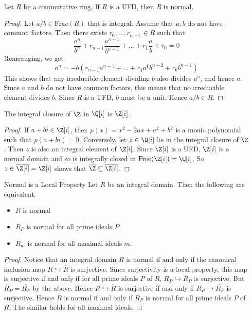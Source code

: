 \documentclass[a4paper]{article}
\begin{document}
\begin{prp}{}{} Let $R$ be a commutative ring. If $R$ is a UFD, then $R$ is normal. \tcbline
\begin{proof}
Let $a/b\in\text{Frac}(R)$ that is integral. Assume that $a,b$ do not have common factors. Then there exists $r_0,\dots,r_{n-1}\in R$ such that $$\frac{a^n}{b^n}+r_{n-1}\frac{a^{n-1}}{b^{n-1}}+\dots+r_1\frac{a}{b}+r_0=0$$ Rearranging, we get $$a^n=-b\left(r_{n-1}a^{n-1}+\dots+r_1a^1b^{n-2}+r_0b^{n-1}\right)$$ This shows that any irreducible element dividing $b$ also divides $a^n$, and hence $a$. Since $a$ and $b$ do not have common factors, this means that no irreducible element divides $b$. Since $R$ is a UFD, $b$ must be a unit. Hence $a/b\in R$. 
\end{proof}
\end{prp}

\begin{eg}{}{} The integral closure of $\Z$ in $\Q[i]$ is $\Z[i]$. \tcbline
\begin{proof}
If $a+bi\in\Z[i]$, then $p(x)=x^2-2ax+a^2+b^2$ is a monic polynomial such that $p(a+bi)=0$. Conversely, let $z\in\Q[i]$ lie in the integral closure of $\Z$. Then $z$ is also an integral element of $\Z[i]$. Since $\Z[i]$ is a UFD, $\Z[i]$ is a normal domain and so is integrally closed in $\text{Frac}(\Z[i])=\Q[i]$. So $z\in\overline{\Z[i]}=\Z[i]$ shows that $\overline{\Z}\subseteq\overline{\Z[i]}$. 
\end{proof}
\end{eg}

\begin{prp}{Normal is a Local Property}{} Let $R$ be an integral domain. Then the following are equivalent. 
\begin{itemize}
\item $R$ is normal
\item $R_P$ is normal for all prime ideals $P$
\item $R_m$ is normal for all maximal ideals $m$. 
\end{itemize} \tcbline
\begin{proof}
Notice that an integral domain $R$ is normal if and only if the canonical inclusion map $R\hookrightarrow\overline{R}$ is surjective. Since surjectivity is a local property, this map is surjective if and only if for all prime ideals $P$ of $R$, $R_P\hookrightarrow\overline{R}_P$ is surjective. But $\overline{R}_P=\overline{R_P}$ by the above. Hence $R\hookrightarrow\overline{R}$ is surjective if and only if $R_P\to\overline{R_P}$ is surjective. Hence $R$ is normal if and only if $R_P$ is normal for all prime ideals $P$ of $R$. The similar holds for all maximal ideals. 
\end{proof}
\end{prp}
\end{document}
